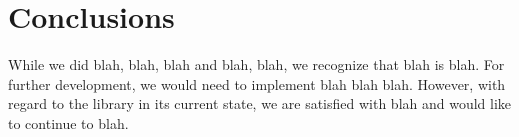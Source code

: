 \documentclass{dependencies/acm_proc_article-sp}
\begin{document}
\section{Conclusions}

While we did blah, blah, blah and blah, blah, we recognize that blah is blah. For further development, we would need to implement blah blah blah. However, with regard to the library in its current state, we are satisfied with blah and would like to continue to blah.

\newpage

\newpage
%

%
%
\balancecolumns
\end{document}
